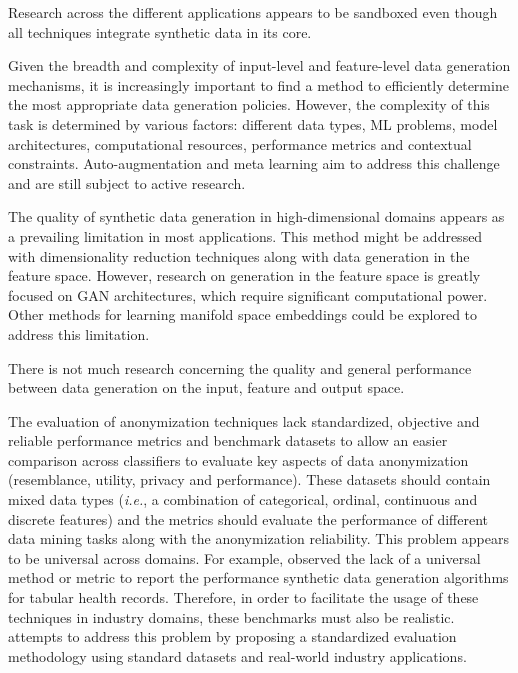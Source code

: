 \documentclass[parskip=full]{scrartcl}
\begin{document}
Research across the different applications appears to be sandboxed even though
all techniques integrate synthetic data in its core.

Given the breadth and complexity of input-level and feature-level data
generation mechanisms, it is increasingly important to find a method to
efficiently determine the most appropriate data generation policies. However,
the complexity of this task is determined by various factors: different data
types, ML problems, model architectures, computational resources, performance
metrics and contextual constraints. Auto-augmentation and meta learning aim to
address this challenge and are still subject to active research.

The quality of synthetic data generation in high-dimensional domains appears
as a prevailing limitation in most applications. This method might be
addressed with dimensionality reduction techniques along with data generation
in the feature space. However, research on generation in the feature space is
greatly focused on GAN architectures, which require significant computational
power. Other methods for learning manifold space embeddings could be explored
to address this limitation.


There is not much research concerning the quality and general performance
between data generation on the input, feature and output space.

The evaluation of anonymization techniques lack standardized, objective and
reliable performance metrics and benchmark datasets to allow an easier
comparison across classifiers to evaluate key aspects of data anonymization
(resemblance, utility, privacy and performance). These datasets should contain
mixed data types (\textit{i.e.}, a combination of categorical, ordinal,
continuous and discrete features) and the metrics should evaluate the
performance of different data mining tasks along with the anonymization
reliability. This problem appears to be universal across domains. For example,
\citet{hernandez2022synthetic} observed the lack of a universal method or
metric to report the performance synthetic data generation algorithms for
tabular health records. Therefore, in order to facilitate the usage of these
techniques in industry domains, these benchmarks must also be
realistic. \citet{rosenblatt2020differentially} attempts to address this
problem by proposing a standardized evaluation methodology using standard
datasets and real-world industry applications.
\end{document}
